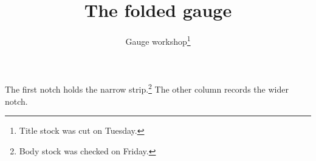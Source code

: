 \documentclass[letterpaper,twocolumn]{article}
\title{The folded gauge}
\author{Gauge workshop\thanks{Title stock was cut on Tuesday.}}
\date{}
\begin{document}
\maketitle
The first notch holds the narrow strip.\footnote{Body stock was checked on Friday.}
\newpage
The other column records the wider notch.
\end{document}

